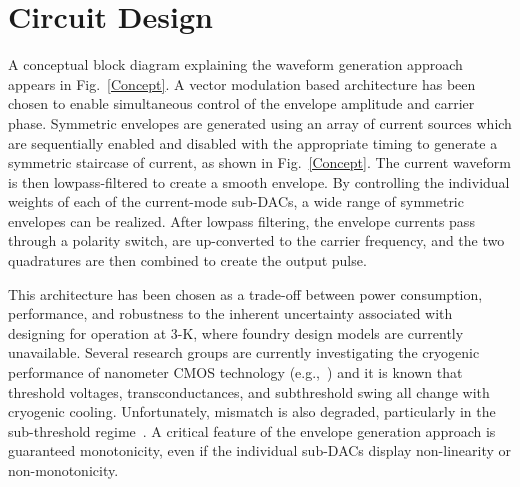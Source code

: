 \documentclass[journal]{IEEEtran}
\newcommand{\CR}[1]{{\color{black}#1}}
\begin{document}






\section{Circuit Design}
A conceptual block diagram explaining the waveform generation approach appears in Fig.~\ref{Concept}. A vector modulation based architecture has been chosen to enable simultaneous control of the envelope amplitude and carrier phase. Symmetric envelopes are generated using an array of current sources which are sequentially enabled and disabled with the appropriate timing to generate a symmetric staircase of current, as shown in Fig.~\ref{Concept}. The current waveform is then lowpass-filtered to create a smooth envelope. By controlling the individual weights of each of the current-mode sub-DACs, a wide range of symmetric envelopes can be realized. After lowpass filtering, the envelope currents pass through a polarity switch, are up-converted to the carrier frequency, and the two quadratures are then combined to create the output pulse. 


This architecture has been chosen as a trade-off between power consumption, performance, and robustness to the inherent uncertainty associated with designing for operation at 3-K, where foundry design models are currently unavailable. Several research groups are currently investigating the cryogenic performance of nanometer CMOS technology (e.g.,~\cite{incandela2018characterization,beckers2018characterization}) and it is known that threshold voltages, transconductances, and subthreshold \CR{swing} all change with cryogenic cooling. Unfortunately, mismatch is also degraded, particularly in the sub-threshold regime~\cite{mismatch}. A critical feature of the envelope generation approach is guaranteed monotonicity, even if the individual sub-DACs display non-linearity or non-monotonicity.
\end{document}
